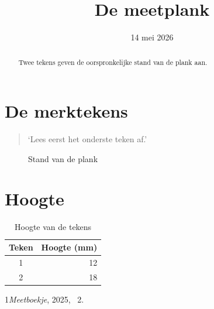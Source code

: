 \documentclass{article}
\begin{document}
\title{De meetplank}\author{}\date{14 mei 2026}\maketitle
\begin{abstract}Twee tekens geven de oorspronkelijke stand van de plank aan.\end{abstract}
\tableofcontents
\section{De merktekens}\begin{quote}‘Lees eerst het onderste teken af.’\end{quote}
\begin{figure}[ht]\centering\fbox{\rule{0pt}{8mm}\rule{33mm}{0pt}}\caption{Stand van de plank}\end{figure}
\section{Hoogte}
\begin{table}[ht]\centering\begin{tabular}{cr}Teken&Hoogte (mm)\\\hline 1&12\\2&18\end{tabular}\caption{Hoogte van de tekens}\end{table}
\begin{thebibliography}{1}\emph{Meetboekje}, 2025, \chaptername~2.\end{thebibliography}
\end{document}
